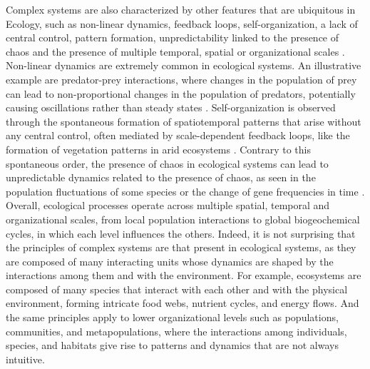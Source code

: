 Complex systems are also characterized by other features that are ubiquitous in
Ecology, such as non-linear dynamics, feedback loops, self-organization, a lack
of central control, pattern formation, unpredictability linked to the presence
of chaos and the presence of multiple temporal, spatial or organizational
scales \cite{Bianconi_2023}. Non-linear dynamics are extremely common in
ecological systems. An illustrative example are predator-prey interactions,
where changes in the population of prey can lead to non-proportional changes in
the population of predators, potentially causing oscillations rather than
steady states \cite{Lotka1925}. Self-organization is observed through the
spontaneous formation of spatiotemporal patterns that arise without any central
control, often mediated by scale-dependent feedback loops, like the formation
of vegetation patterns in arid ecosystems \cite{Rietkerk2008}. Contrary to
this spontaneous order, the presence of chaos in ecological systems can lead to
unpredictable dynamics related to the presence of chaos, as seen in the
population fluctuations of some species or the change of gene frequencies in
time \cite{May1974,May1976}. Overall, ecological processes operate across
multiple spatial, temporal and organizational scales, from local population
interactions to global biogeochemical cycles, in which each level influences
the others. Indeed, it is not surprising that the principles of complex systems
are that present in ecological systems, as they are composed of many
interacting units whose dynamics are shaped by the interactions among them and
with the environment. For example, ecosystems are composed of many species that
interact with each other and with the physical environment, forming intricate
food webs, nutrient cycles, and energy flows. And the same principles apply to
lower organizational levels such as populations, communities, and
metapopulations, where the interactions among individuals, species, and
habitats give rise to patterns and dynamics that are not always intuitive.

